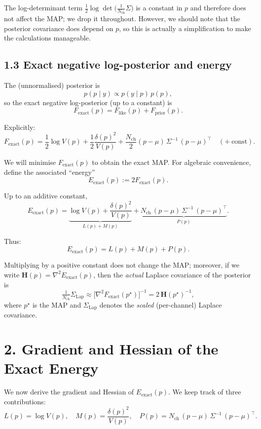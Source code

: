 \documentclass[11pt]{article}
\begin{document}
The log-determinant term $\frac12\log\det\bigl(\tfrac{1}{N_{\text{ch}}}\Sigma\bigr)$
is a constant in $p$ and therefore does not affect the MAP; we drop
it throughout.  However, we should note that the posterior covariance
does depend on $p$, so this is actually a simplification to make the
calculations manageable.

\subsection*{1.3 Exact negative log-posterior and energy}

The (unnormalised) posterior is
\[
  p(p\mid y) \propto p(y\mid p)\,p(p),
\]
so the exact negative log-posterior (up to a constant) is
\[
  F_{\text{exact}}(p)
  =
  F_{\text{like}}(p) + F_{\text{prior}}(p).
\]

Explicitly:
\[
  F_{\text{exact}}(p)
  =
  \frac{1}{2}\log V(p)
  + \frac{1}{2}\frac{\delta(p)^2}{V(p)}
  + \frac{N_{\text{ch}}}{2}(p-\mu)\,\Sigma^{-1}\,(p-\mu)^\top
  \quad(+\ \text{const}).
\]

We will minimise $F_{\text{exact}}(p)$ to obtain the exact MAP.  For
algebraic convenience, define the associated ``energy''
\[
  E_{\text{exact}}(p)
  := 2F_{\text{exact}}(p).
\]

Up to an additive constant,
\[
  E_{\text{exact}}(p)
  =
  \underbrace{\log V(p) + \frac{\delta(p)^2}{V(p)}}_{L(p) + M(p)}
  +
  \underbrace{N_{\text{ch}}\,(p-\mu)\,\Sigma^{-1}\,(p-\mu)^\top}_{P(p)}.
\]

Thus:
\[
  E_{\text{exact}}(p) = L(p) + M(p) + P(p).
\]

Multiplying by a positive constant does not change the MAP; moreover,
if we write $\mathbf{H}(p) = \nabla^2 E_{\text{exact}}(p)$, then the
\emph{actual} Laplace covariance of the posterior is
\[
  \tfrac{1}{N_{\text{ch}}}\Sigma_{\text{Lap}}
  \approx
  \bigl[\nabla^2 F_{\text{exact}}(p^\star)\bigr]^{-1}
  =
  2\,\mathbf{H}(p^\star)^{-1},
\]
where $p^\star$ is the MAP and $\Sigma_{\text{Lap}}$ denotes the
\emph{scaled} (per-channel) Laplace covariance.

\section*{2. Gradient and Hessian of the Exact Energy}

We now derive the gradient and Hessian of $E_{\text{exact}}(p)$.  We
keep track of three contributions:
\[
  L(p) = \log V(p),
  \quad
  M(p) = \frac{\delta(p)^2}{V(p)},
  \quad
  P(p) = N_{\text{ch}}\,(p-\mu)\,\Sigma^{-1}\,(p-\mu)^\top.
\]
\end{document}
